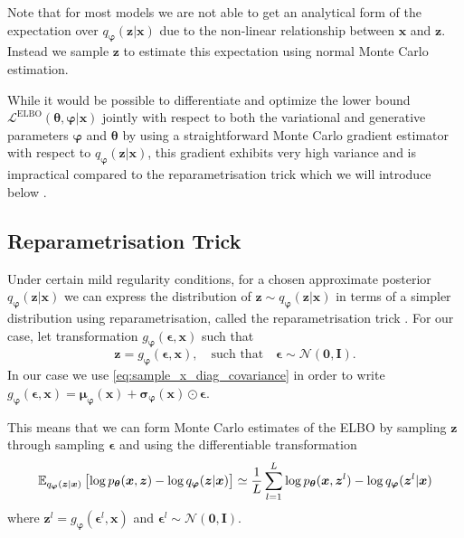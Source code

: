 Note that for most models we are not able to get an analytical form of the
expectation over $q_{\bm{\varphi}}(\bm{z} | \bm{x})$ due to the non-linear
relationship between $\bm{x}$ and $\bm{z}$. Instead we sample $\bm{z}$ to
estimate this expectation using normal Monte Carlo estimation.

While it would be possible to differentiate and optimize the lower bound
$\mathcal{L}^{\text{ELBO}}(\bm{\theta}, \bm{\varphi} | \bm{x})$ jointly with
respect to both the variational and generative parameters $\bm{\varphi}$ and
$\bm{\theta}$ by using a straightforward Monte Carlo gradient estimator with respect
to $q_{\bm{\varphi}}(\bm{z} | \bm{x})$, this gradient exhibits very high
variance and is impractical compared to the reparametrisation trick which we will introduce below \cite{kingma_auto-encoding_2013}.

\subsection{Reparametrisation Trick}
Under certain mild regularity conditions, for a chosen approximate posterior
$q_{\bm{\varphi}}(\bm{z} | \bm{x})$ we can express the distribution of $\bm{z}
\sim q_{\bm{\varphi}}(\bm{z} | \bm{x})$ in terms of a simpler distribution using
reparametrisation, called the reparametrisation trick
\cite{kingma_auto-encoding_2013}. For our case, let transformation $g_{\bm{\varphi}}(\bm{\epsilon},
\bm{x})$ such that
\begin{equation}
  \label{eq:reparametrisation_trick}
  \bm{z} = g_{\bm{\varphi}}(\bm{\epsilon}, \bm{x}), \quad \text{such that} \quad \bm{\epsilon} \sim \mathcal{N}(\bm{0}, \bm{I}).
\end{equation}
In our case we use \eqref{eq:sample_x_diag_covariance} in order to write
$g_{\bm{\varphi}}(\bm{\epsilon}, \bm{x}) = \bm{\mu}_{\bm{\varphi}}(\bm{x}) +
\bm{\sigma}_{\bm{\varphi}}(\bm{x}) \odot \bm{\epsilon}$.

This means that we can form Monte Carlo estimates of the ELBO by sampling
$\bm{z}$ through sampling $\bm{\epsilon}$ and using the differentiable
transformation
\begin{equation}
  \label{eq:SGVB}
    \operatorname{\mathbb{E}}_{q_{\bm{\varphi}}(\bm{z} | \bm{x})} \left[ \log p_{\bm{\theta}}(\bm{x},  \bm{z}) - \log q_{\bm{\varphi}}(\bm{z} | \bm{x}) \right] \simeq \frac{1}{L} \sum_{l=1}^L \log p_{\bm{\theta}}(\bm{x},  \bm{z}^{l}) - \log q_{\bm{\varphi}}(\bm{z}^{l} | \bm{x})
\end{equation}
where $\bm{z}^{l} = g_{\bm{\varphi}}(\bm{\epsilon}^{l}, \bm{x})$ and
$\bm{\epsilon}^{l} \sim \mathcal{N}(\bm{0}, \bm{I})$.

